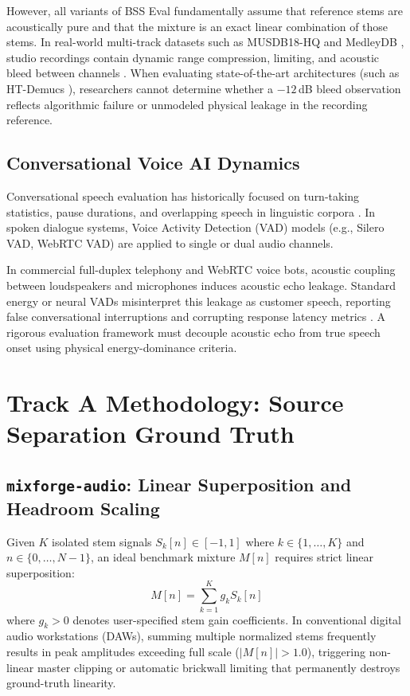 \documentclass[10pt,journal,compsoc]{IEEEtran}
\begin{document}
However, all variants of BSS Eval fundamentally assume that reference stems are acoustically pure and that the mixture is an exact linear combination of those stems. In real-world multi-track datasets such as MUSDB18-HQ \cite{rafii2017musdb18} and MedleyDB \cite{bittner2014medleydb}, studio recordings contain dynamic range compression, limiting, and acoustic bleed between channels \cite{cano2018musical}. When evaluating state-of-the-art architectures (such as HT-Demucs \cite{rouard2023hybrid}), researchers cannot determine whether a $-12$\,dB bleed observation reflects algorithmic failure or unmodeled physical leakage in the recording reference.

\subsection{Conversational Voice AI Dynamics}
Conversational speech evaluation has historically focused on turn-taking statistics, pause durations, and overlapping speech in linguistic corpora \cite{heldner2010pauses,levinson2015turn,godfrey1992switchboard}. In spoken dialogue systems, Voice Activity Detection (VAD) models (e.g., Silero VAD, WebRTC VAD) are applied to single or dual audio channels. 

In commercial full-duplex telephony and WebRTC voice bots, acoustic coupling between loudspeakers and microphones induces acoustic echo leakage. Standard energy or neural VADs misinterpret this leakage as customer speech, reporting false conversational interruptions and corrupting response latency metrics \cite{skerry2023evaluating}. A rigorous evaluation framework must decouple acoustic echo from true speech onset using physical energy-dominance criteria.

\section{Track A Methodology: Source Separation Ground Truth}

\subsection{\texttt{mixforge-audio}: Linear Superposition and Headroom Scaling}
Given $K$ isolated stem signals $S_k[n] \in [-1, 1]$ where $k \in \{1, \dots, K\}$ and $n \in \{0, \dots, N-1\}$, an ideal benchmark mixture $M[n]$ requires strict linear superposition:
\begin{equation}
M[n] = \sum_{k=1}^K g_k S_k[n]
\end{equation}
where $g_k > 0$ denotes user-specified stem gain coefficients. In conventional digital audio workstations (DAWs), summing multiple normalized stems frequently results in peak amplitudes exceeding full scale ($|M[n]| > 1.0$), triggering non-linear master clipping or automatic brickwall limiting that permanently destroys ground-truth linearity.
\end{document}
